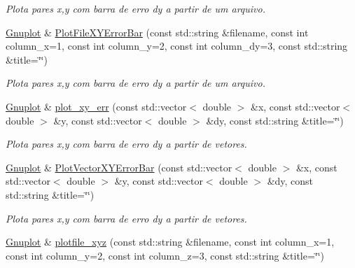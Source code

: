 \begin{DoxyCompactItemize}
\begin{DoxyCompactList}\small\item\em Plota pares x,y com barra de erro dy a partir de um arquivo. \end{DoxyCompactList}\item 
\hypertarget{classGnuplot_a759edbd9404476415a4d6d5a286c360c}{\hyperlink{classGnuplot}{Gnuplot} \& \hyperlink{classGnuplot_a759edbd9404476415a4d6d5a286c360c}{Plot\-File\-X\-Y\-Error\-Bar} (const std\-::string \&filename, const int column\-\_\-x=1, const int column\-\_\-y=2, const int column\-\_\-dy=3, const std\-::string \&title=\char`\"{}\char`\"{})}\label{classGnuplot_a759edbd9404476415a4d6d5a286c360c}

\begin{DoxyCompactList}\small\item\em Plota pares x,y com barra de erro dy a partir de um arquivo. \end{DoxyCompactList}\item 
\hypertarget{classGnuplot_a3dd3934b09094a9ba48035a2edf4d4fd}{\hyperlink{classGnuplot}{Gnuplot} \& \hyperlink{classGnuplot_a3dd3934b09094a9ba48035a2edf4d4fd}{plot\-\_\-xy\-\_\-err} (const std\-::vector$<$ double $>$ \&x, const std\-::vector$<$ double $>$ \&y, const std\-::vector$<$ double $>$ \&dy, const std\-::string \&title=\char`\"{}\char`\"{})}\label{classGnuplot_a3dd3934b09094a9ba48035a2edf4d4fd}

\begin{DoxyCompactList}\small\item\em Plota pares x,y com barra de erro dy a partir de vetores. \end{DoxyCompactList}\item 
\hypertarget{classGnuplot_a6d3863c1b14d93c14b50df0a11dfdbd8}{\hyperlink{classGnuplot}{Gnuplot} \& \hyperlink{classGnuplot_a6d3863c1b14d93c14b50df0a11dfdbd8}{Plot\-Vector\-X\-Y\-Error\-Bar} (const std\-::vector$<$ double $>$ \&x, const std\-::vector$<$ double $>$ \&y, const std\-::vector$<$ double $>$ \&dy, const std\-::string \&title=\char`\"{}\char`\"{})}\label{classGnuplot_a6d3863c1b14d93c14b50df0a11dfdbd8}

\begin{DoxyCompactList}\small\item\em Plota pares x,y com barra de erro dy a partir de vetores. \end{DoxyCompactList}\item 
\hypertarget{classGnuplot_abd1c17c49fc59979a1143384c77c5b66}{\hyperlink{classGnuplot}{Gnuplot} \& \hyperlink{classGnuplot_abd1c17c49fc59979a1143384c77c5b66}{plotfile\-\_\-xyz} (const std\-::string \&filename, const int column\-\_\-x=1, const int column\-\_\-y=2, const int column\-\_\-z=3, const std\-::string \&title=\char`\"{}\char`\"{})}\label{classGnuplot_abd1c17c49fc59979a1143384c77c5b66}


\end{DoxyCompactItemize}
